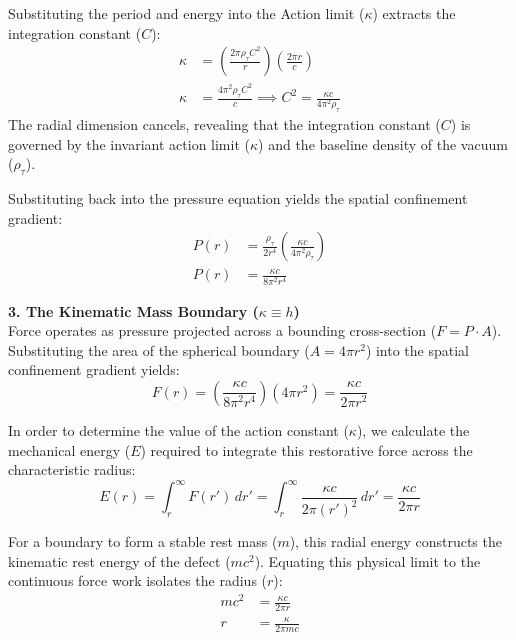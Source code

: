 Substituting the period and energy into the Action limit ($\kappa$) extracts the integration constant ($C$):
\begin{align}
    \kappa &= \left( \frac{2\pi \rho_\tau C^2}{r} \right) \left( \frac{2\pi r}{c} \right) \nonumber \\
    \kappa &= \frac{4\pi^2 \rho_\tau C^2}{c} \implies C^2 = \frac{\kappa c}{4\pi^2 \rho_\tau}
\end{align}
The radial dimension cancels, revealing that the integration constant ($C$) is governed by the invariant action limit ($\kappa$) and the baseline density of the vacuum ($\rho_\tau$).

Substituting back into the pressure equation yields the spatial confinement gradient:
\begin{align}
    P(r) &= \frac{\rho_\tau}{2 r^4} \left( \frac{\kappa c}{4\pi^2 \rho_\tau} \right) \nonumber \\
    P(r) &= \frac{\kappa c}{8\pi^2 r^4}
\end{align}


\textbf{3. The Kinematic Mass Boundary ($\kappa \equiv h$)} \\
Force operates as pressure projected across a bounding cross-section ($F = P \cdot A$). Substituting the area of the spherical boundary ($A = 4\pi r^2$) into the spatial confinement gradient yields:
\begin{equation}
    F(r) = \left( \frac{\kappa c}{8\pi^2 r^4} \right) (4\pi r^2) = \frac{\kappa c}{2\pi r^2}
\end{equation}

In order to determine the value of the action constant ($\kappa$), we calculate the mechanical energy ($E$) required to integrate this restorative force across the characteristic radius: 
\begin{equation}
    E(r) = \int_r^\infty F(r') \, dr' = \int_r^\infty \frac{\kappa c}{2\pi (r')^2} \, dr' = \frac{\kappa c}{2\pi r} 
\end{equation}

For a boundary to form a stable rest mass ($m$), this radial energy constructs the kinematic rest energy of the defect ($mc^2$). Equating this physical limit to the continuous force work isolates the radius ($r$):
\begin{align}
    mc^2 &= \frac{\kappa c}{2\pi r} \nonumber \\
    r &= \frac{\kappa}{2\pi mc}
\end{align}

